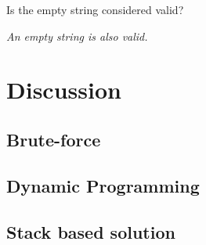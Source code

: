 \begin{QandA}
	\item Is the empty string considered valid?
	\begin{answered}
		\textit{An empty string is also valid.}
	\end{answered}
	
\end{QandA}

\section{Discussion}
\label{valid_parenthesis:sec:discussion}


\subsection{Brute-force}
\label{valid_parenthesis:sec:bruteforce}

\subsection{Dynamic Programming}
\label{valid_parenthesis:sec:twostacks}


\subsection{Stack based solution}
\label{valid_parenthesis:sec:twostacks}



